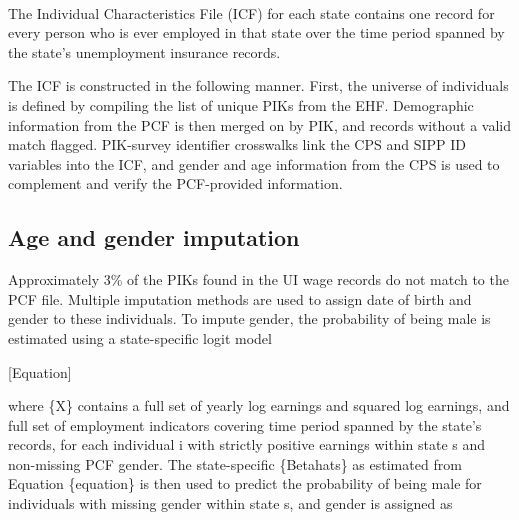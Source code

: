 

\

The Individual Characteristics File (ICF) for each state contains one record for every person who is ever employed in that state over the time period spanned by the state's unemployment insurance records. 





The ICF is constructed in the following manner. First, the universe of individuals is defined by compiling the list of unique PIKs from the EHF. Demographic information from the PCF is then merged on by PIK, and records without a valid match flagged. PIK-survey identifier crosswalks link the CPS and SIPP ID variables into the ICF, and gender and age information from the CPS is used to complement and verify the PCF-provided information. 





\subsection{Age and gender imputation}





Approximately 3{\%} of the PIKs found in the UI wage records do not match to the PCF file. Multiple imputation methods are used to assign date of birth and gender to these individuals. To impute gender, the probability of being male is estimated using a state-specific logit model





[Equation]





\noindent
where {\{}X{\}} contains a full set of yearly log earnings and squared log earnings, and full set of employment indicators covering time period spanned by the state's records, for each individual i with strictly positive earnings within state s and non-missing PCF gender. The state-specific {\{}Betahats{\}} as estimated from Equation {\{}equation{\}} is then used to predict the probability of being male for individuals with missing gender within state s, and gender is assigned as 





